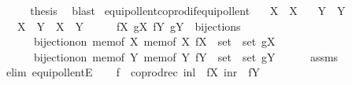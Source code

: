 \begin{isabellebody}
\ \ \isamarkupfalse%
\ \isamarkupfalse%
\ {\isacharquery}{\kern0pt}thesis\ \isamarkupfalse%
\ blast\isanewline
{}\isamarkupfalse%
%
\endisatagproof
{\isafoldproof}%
%
\isadelimproof
\isanewline
%
\endisadelimproof
\isanewline
{}\isamarkupfalse%
\ equipollent{\isacharunderscore}{\kern0pt}coprod{\isacharunderscore}{\kern0pt}if{\isacharunderscore}{\kern0pt}equipollent{\isacharcolon}{\kern0pt}\isanewline
\ \ \ {\isachardoublequoteopen}X\ {\isasymapprox}\ X{\isacharprime}{\kern0pt}{\isachardoublequoteclose}\isanewline
\ \ \ {\isachardoublequoteopen}Y\ {\isasymapprox}\ Y{\isacharprime}{\kern0pt}{\isachardoublequoteclose}\isanewline
\ \ \ {\isachardoublequoteopen}X\ {\isasymCoprod}\ Y\ {\isasymapprox}\ X{\isacharprime}{\kern0pt}\ {\isasymCoprod}\ Y{\isacharprime}{\kern0pt}{\isachardoublequoteclose}\isanewline
%
\isadelimproof
%
\endisadelimproof
%
\isatagproof
{}\isamarkupfalse%
\ {\isacharminus}{\kern0pt}\isanewline
\ \ \isamarkupfalse%
\ fX\ gX\ fY\ gY\ \ bijections{\isacharcolon}{\kern0pt}\isanewline
\ \ \ \ \ \ {\isachardoublequoteopen}bijection{\isacharunderscore}{\kern0pt}on\ {\isacharparenleft}{\kern0pt}mem{\isacharunderscore}{\kern0pt}of\ X{\isacharparenright}{\kern0pt}\ {\isacharparenleft}{\kern0pt}mem{\isacharunderscore}{\kern0pt}of\ X{\isacharprime}{\kern0pt}{\isacharparenright}{\kern0pt}\ {\isacharparenleft}{\kern0pt}fX\ {\isacharcolon}{\kern0pt}{\isacharcolon}{\kern0pt}\ set\ {\isasymRightarrow}\ set{\isacharparenright}{\kern0pt}\ gX{\isachardoublequoteclose}\isanewline
\ \ \ \ \ \ {\isachardoublequoteopen}bijection{\isacharunderscore}{\kern0pt}on\ {\isacharparenleft}{\kern0pt}mem{\isacharunderscore}{\kern0pt}of\ Y{\isacharparenright}{\kern0pt}\ {\isacharparenleft}{\kern0pt}mem{\isacharunderscore}{\kern0pt}of\ Y{\isacharprime}{\kern0pt}{\isacharparenright}{\kern0pt}\ {\isacharparenleft}{\kern0pt}fY\ {\isacharcolon}{\kern0pt}{\isacharcolon}{\kern0pt}\ set\ {\isasymRightarrow}\ set{\isacharparenright}{\kern0pt}\ gY{\isachardoublequoteclose}\isanewline
\ \ \ \ \isamarkupfalse%
\ assms\ \isamarkupfalse%
\ {\isacharparenleft}{\kern0pt}elim\ equipollentE{\isacharparenright}{\kern0pt}\isanewline
\ \ \isamarkupfalse%
\ {\isacharquery}{\kern0pt}f\ {\isacharequal}{\kern0pt}\ {\isachardoublequoteopen}coprod{\isacharunderscore}{\kern0pt}rec\ {\isacharparenleft}{\kern0pt}inl\ {\isasymcirc}\ fX{\isacharparenright}{\kern0pt}\ {\isacharparenleft}{\kern0pt}inr\ {\isasymcirc}\ fY{\isacharparenright}{\kern0pt}{\isachardoublequoteclose}\isanewline

\end{isabellebody}
